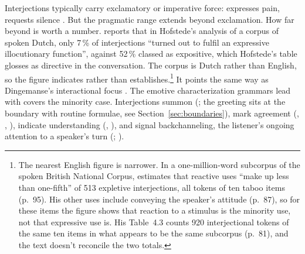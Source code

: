\documentclass[12pt]{article}
\begin{document}
Interjections typically carry exclamatory or imperative force: 
expresses pain,  requests silence \citep[88, 853]{quirk1985}. But
the pragmatic range extends beyond exclamation. How far beyond is worth a
number. \textcite[18]{elffers2008} reports that in Hofstede's analysis of a
corpus of spoken Dutch, only 7\,\% of interjections
\enquote{turned out to fulfil an expressive illocutionary function},
against 52\,\% classed as expositive, which Hofstede's table glosses as
directive in the conversation. The corpus is Dutch rather than English, so the figure indicates
rather than establishes.\footnote{The nearest English figure is narrower. In a
  one-million-word subcorpus of the spoken British National Corpus,
  \textcite[85]{ljung2011} estimates that reactive uses \enquote{make up less
  than one-fifth} of 513 expletive interjections, all tokens of ten taboo
  items (p.~95). His other uses include conveying the speaker's attitude
  (p.~87), so for these items the figure shows that reaction to a stimulus is
  the minority use, not that expressive use is. His Table~4.3 counts 920
  interjectional tokens of the same ten items in what appears to be the same
  subcorpus (p.~81), and the text doesn't reconcile the two totals.} It points the same way as Dingemanse's interactional
focus \citep[259]{dingemanse2024}. The emotive characterization grammars lead
with covers the minority case. Interjections summon (; the
greeting  sits at the boundary with routine formulae, see
Section~\ref{sec:boundaries}), mark agreement (,
, ), indicate understanding (, ),
and signal backchanneling, the listener's ongoing attention to a speaker's
turn (\citealp[868, 873--876]{norrick2009}; \citealp[265]{dingemanse2024}).
\end{document}
